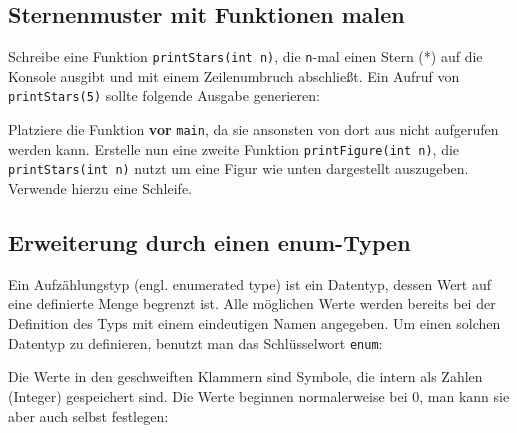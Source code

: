 \subsection{Sternenmuster mit Funktionen malen}

Schreibe eine Funktion \lstinline{printStars(int n)}, die \lstinline{n}-mal einen Stern (*) auf die Konsole ausgibt und mit einem Zeilenumbruch abschließt.
Ein Aufruf von \lstinline{printStars(5)} sollte folgende Ausgabe generieren:


Platziere die Funktion \textbf{vor} \lstinline{main}, da sie ansonsten von dort aus nicht aufgerufen werden kann.
Erstelle nun eine zweite Funktion \lstinline{printFigure(int n)}, die \lstinline{printStars(int n)} nutzt um eine Figur wie unten dargestellt auszugeben.
Verwende hierzu eine Schleife.



\subsection{Erweiterung durch einen enum-Typen}
\label{sec:basics_enumtype}
Ein Aufzählungstyp (engl. enumerated type) ist ein Datentyp, dessen Wert auf eine definierte Menge begrenzt ist.
Alle möglichen Werte werden bereits bei der Definition des Typs mit einem eindeutigen Namen angegeben. Um einen solchen Datentyp zu definieren, benutzt man das Schlüsselwort \lstinline{enum}: 


Die Werte in den geschweiften Klammern sind Symbole, die intern als Zahlen (Integer) gespeichert sind. Die Werte beginnen normalerweise bei 0, man kann sie aber auch selbst festlegen:

